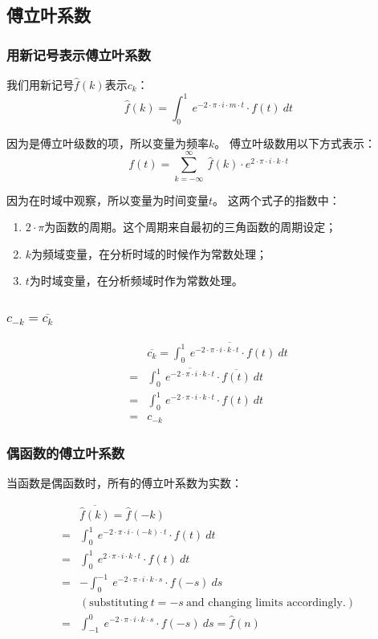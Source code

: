\subsection{傅立叶系数}
\subsubsection{用新记号表示傅立叶系数}
我们用新记号$\hat{f}(k)$表示$c_k$：
\begin{equation}
	\hat{f}(k)=\int_0^1 \ e^{-2\cdot \pi\cdot i\cdot m\cdot t}\cdot f(t)\ dt
\end{equation}

因为是傅立叶级数的项，所以变量为频率$k$。
傅立叶级数用以下方式表示：
\begin{equation}
	f(t)=\sum\limits_{k=-\infty}^\infty\ \hat{f}(k)\cdot e^{2\cdot \pi\cdot i\cdot k\cdot t }
\end{equation}

因为在时域中观察，所以变量为时间变量$t$。
这两个式子的指数中：
\begin{enumerate}
	\item $2\cdot \pi$为函数的周期。这个周期来自最初的三角函数的周期设定；
	\item $k​$为频域变量，在分析时域的时候作为常数处理；
	\item $t$为时域变量，在分析频域时作为常数处理。
\end{enumerate}

\subsubsection{$c_{-k}=\overline{c_k}$}

\begin{align*}
	  & \overline{c_k}= \overline{\int_0^1\ e^{-2\cdot \pi\cdot i\cdot k\cdot t}\cdot f(t)\ dt} \\
	= & \int_0^1\ \overline{e^{-2\cdot\pi\cdot i\cdot k\cdot t}}\cdot \overline{f(t)}\ dt       \\
	= & \int_0^1\ e^{-2\cdot\pi\cdot i\cdot k\cdot t}\cdot f(t)\ dt                             \\
	= & c_{-k}
\end{align*}
\subsubsection{偶函数的傅立叶系数}
当函数是偶函数时，所有的傅立叶系数为实数：

\begin{align*}
	  & \overline{\hat{f}(k)}= \hat{f}(-k)                                           \\
	= & \int_0^1\ e^{-2\cdot\pi\cdot i\cdot(-k)\cdot t}\cdot f(t)\ dt                \\
	= & \int_0^1\ e^{2\cdot\pi\cdot i\cdot k\cdot t}\cdot f(t)\ dt                   \\
	= & -\int_0^{-1}\ e^{-2\cdot\pi\cdot i\cdot k\cdot s}\cdot f(-s)\ ds             \\
	  & (\text{substituting}\ t = −s\ \text{and changing  limits  accordingly.} )    \\
	= & \int_{-1}^0\ e^{-2\cdot\pi\cdot i\cdot k\cdot s}\cdot f(-s)\ ds = \hat{f}(n)
\end{align*}

